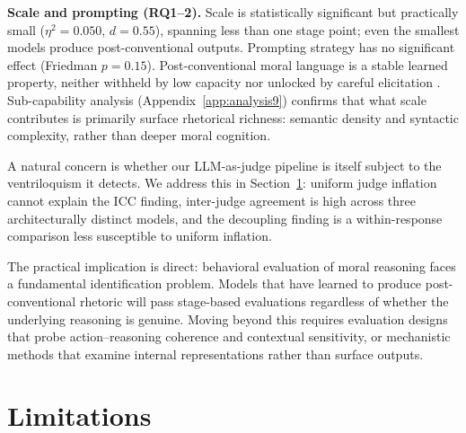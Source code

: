 \documentclass{article}
\begin{document}
\textbf{Scale and prompting (RQ1--2).} Scale is statistically significant but practically small ($\eta^2=0.050$, $d=0.55$), spanning less than one stage point; even the smallest models produce post-conventional outputs. Prompting strategy has no significant effect (Friedman $p=0.15$). Post-conventional moral language is a stable learned property, neither withheld by low capacity nor unlocked by careful elicitation \citep{kambhampati2024planllms}. Sub-capability analysis (Appendix~\ref{app:analysis9}) confirms that what scale contributes is primarily surface rhetorical richness: semantic density and syntactic complexity, rather than deeper moral cognition.

A natural concern is whether our LLM-as-judge pipeline is itself subject to the ventriloquism it detects. We address this in Section~\ref{sec:limitations}: uniform judge inflation cannot explain the ICC finding, inter-judge agreement is high across three architecturally distinct models, and the decoupling finding is a within-response comparison less susceptible to uniform inflation.

The practical implication is direct: behavioral evaluation of moral reasoning faces a fundamental identification problem. Models that have learned to produce post-conventional rhetoric will pass stage-based evaluations regardless of whether the underlying reasoning is genuine. Moving beyond this requires evaluation designs that probe action--reasoning coherence and contextual sensitivity, or mechanistic methods that examine internal representations rather than surface outputs.


\section{Limitations}
\label{sec:limitations}
\end{document}
